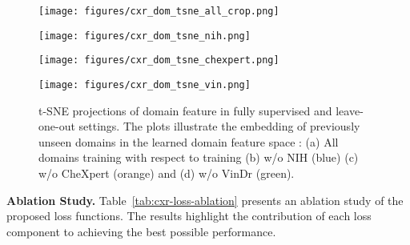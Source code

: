 \documentclass[runningheads]{llncs}
\begin{document}
\begin{figure}[ht]
    \centering
    \begin{minipage}{0.24\textwidth}
        \centering
        \texttt{[image: figures/cxr\_dom\_tsne\_all\_crop.png]}
    \end{minipage}
    \begin{minipage}{0.24\textwidth}
        \centering
        \texttt{[image: figures/cxr\_dom\_tsne\_nih.png]}
    \end{minipage}
    \begin{minipage}{0.24\textwidth}
        \centering
        \texttt{[image: figures/cxr\_dom\_tsne\_chexpert.png]}
    \end{minipage}
    \begin{minipage}{0.24\textwidth}
        \centering
        \texttt{[image: figures/cxr\_dom\_tsne\_vin.png]}
    \end{minipage}
    \caption{t-SNE projections of domain feature in fully supervised and leave-one-out settings. The plots illustrate the embedding of previously unseen domains in the learned domain feature space : (a) All domains training with respect to training  (b) w/o NIH (blue) (c) w/o CheXpert (orange) and (d) w/o VinDr (green).}
    \label{fig:cxr-dom-clf-tsne}
\end{figure}
\noindent\textbf{Ablation Study.}
Table~\ref{tab:cxr-loss-ablation} presents an ablation study of the proposed loss functions. The results highlight the contribution of each loss component to achieving the best possible performance. 
\end{document}
